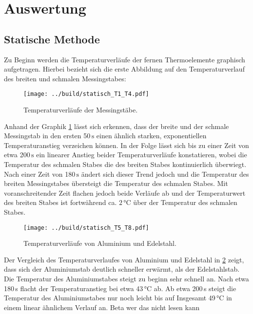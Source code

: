 


\section{Auswertung}
\label{sec:Auswertung}

\subsection{Statische Methode}
\label{sec:Statische Methode}

Zu Beginn werden die Temperaturverläufe der fernen Thermoelemente graphisch aufgetragen. Hierbei bezieht sich die erste Abbildung
auf den Temperaturverlauf des breiten und schmalen Messingstabes:

\begin{figure}
  \centering
  \texttt{[image: ../build/statisch\_T1\_T4.pdf]}
  \caption{Temperaturverläufe der Messingstäbe.}
  \label{fig:statisch1}
\end{figure}

Anhand der Graphik \ref{fig:statisch1} lässt sich erkennen, dass der breite und der schmale Messingstab in den ersten 50\,$\unit{\second}$
einen ähnlich starken, exponentiellen Temperaturanstieg verzeichen können. In der Folge lässt sich bis zu einer Zeit von etwa 
200\,$\unit{\second}$ ein linearer Anstieg beider Temperaturverläufe konstatieren, wobei die Temperatur des schmalen Stabes die 
des breiten Stabes kontinuierlich überwiegt. Nach einer Zeit von 180\,$\unit{\second}$ ändert sich dieser Trend jedoch und die
Temperatur des breiten Messingstabes übersteigt die Temperatur des schmalen Stabes. Mit voranschreitender Zeit flachen jedoch beide
Verläufe ab und der Temperaturwert des breiten Stabes ist fortwährend ca. $2\,\unit{\celsius}$ über der Temperatur des schmalen Stabes.
\newpage

\begin{figure}
  \centering
  \texttt{[image: ../build/statisch\_T5\_T8.pdf]}
  \caption{Temperaturverläufe von Aluminium und Edelstahl.}
  \label{fig:statisch2}
\end{figure}

Der Vergleich des Temperaturverlaufes von Aluminium und Edelstahl in \ref{fig:statisch2} zeigt, dass 
sich der Aluminiumstab deutlich schneller erwärmt, als der Edelstahlstab.
Die Temperatur des Aluminiumstabes steigt zu beginn sehr schnell an. Nach etwa 180\,\unit{\second} 
flacht der Temperaturanstieg bei etwa 43\,\unit{\celsius} ab. Ab etwa 200\,\unit{\second} steigt die Temperatur des Aluminiumstabes 
nur noch leicht bis auf Insgesamt 49\,\unit{\celsius} in einem linear ähnlichem Verlauf an. Beta wer das nicht lesen kann 


